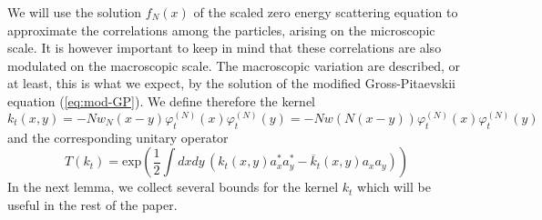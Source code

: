 \documentclass[11pt,a4paper,DIV11]{scrartcl}	%
\newcommand{\ph}{\varphi_t^{(N)}}	%
\begin{document}
We will use the solution $f_N (x)$ of the scaled zero energy scattering equation to approximate the correlations among the particles, arising on the microscopic scale. It is however important to keep in mind that these correlations are also modulated on the macroscopic scale. The macroscopic variation are described, or at least, this is what we expect, by the solution of the modified Gross-Pitaevskii equation (\ref{eq:mod-GP}). We define therefore the kernel
\begin{equation}\label{eq:kt} 
k_t (x,y)  = - N w_N (x-y) \ph (x) \ph (y) = - N w (N (x-y)) \ph (x) \ph (y) \end{equation}
and the corresponding unitary operator
 \[ T (k_t) = \text{exp} \left( \frac{1}{2} \int dx dy \, \left( k_t (x,y) a_x^* a_y^* - \overline{k}_t (x,y) a_x a_y \right)\right) \]
In the next lemma, we collect several bounds for the kernel $k_t$ which will be useful in the rest of the paper. 
\end{document}
